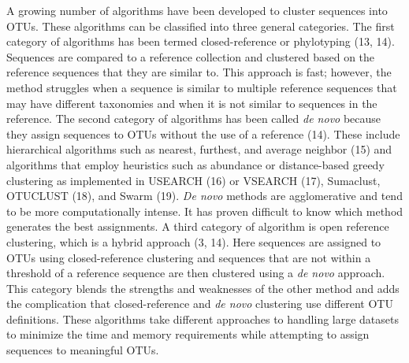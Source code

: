 \documentclass[11pt,]{article}
\begin{document}
A growing number of algorithms have been developed to cluster sequences
into OTUs. These algorithms can be classified into three general
categories. The first category of algorithms has been termed
closed-reference or phylotyping (13, 14). Sequences are compared to a
reference collection and clustered based on the reference sequences that
they are similar to. This approach is fast; however, the method
struggles when a sequence is similar to multiple reference sequences
that may have different taxonomies and when it is not similar to
sequences in the reference. The second category of algorithms has been
called \emph{de novo} because they assign sequences to OTUs without the
use of a reference (14). These include hierarchical algorithms such as
nearest, furthest, and average neighbor (15) and algorithms that employ
heuristics such as abundance or distance-based greedy clustering as
implemented in USEARCH (16) or VSEARCH (17), Sumaclust, OTUCLUST (18),
and Swarm (19). \emph{De novo} methods are agglomerative and tend to be
more computationally intense. It has proven difficult to know which
method generates the best assignments. A third category of algorithm is
open reference clustering, which is a hybrid approach (3, 14). Here
sequences are assigned to OTUs using closed-reference clustering and
sequences that are not within a threshold of a reference sequence are
then clustered using a \emph{de novo} approach. This category blends the
strengths and weaknesses of the other method and adds the complication
that closed-reference and \emph{de novo} clustering use different OTU
definitions. These algorithms take different approaches to handling
large datasets to minimize the time and memory requirements while
attempting to assign sequences to meaningful OTUs.
\end{document}

